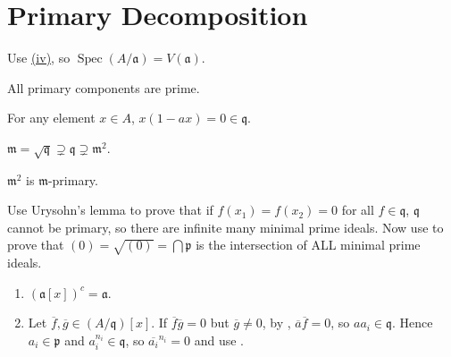 \section{Primary Decomposition}

\begin{exercise}\label{ex4.1}
	Use \hyperref[ex1.21]{(iv)}, so $\operatorname{Spec}(A/\mathfrak{a})=V(\mathfrak{a})$.
\end{exercise}

\begin{exercise}\label{ex4.2}
	All primary components are prime.
\end{exercise}

\begin{exercise}\label{ex4.3}
	For any element $x\in A$, $x(1-ax)=0\in\mathfrak{q}$.
\end{exercise}

\begin{exercise}\label{ex4.4}
	$\mathfrak{m}=\sqrt{\mathfrak{q}}\supsetneq\mathfrak{q}\supsetneq\mathfrak{m}^2$.
\end{exercise}

\begin{exercise}\label{ex4.5}
	$\mathfrak{m}^2$ is $\mathfrak{m}$-primary.
\end{exercise}

\begin{exercise}\label{ex4.6}
	Use Urysohn's lemma to prove that if $f\left(x_1\right)=f\left(x_2\right)=0$ for all $f\in\mathfrak{q}$, $\mathfrak{q}$ cannot be primary, so there are infinite many minimal prime ideals. Now use  to prove that $(0)=\sqrt{(0)}=\bigcap\mathfrak{p}$ is the intersection of ALL minimal prime ideals.
\end{exercise}

\begin{exercise}\label{ex4.7}
	\begin{enumerate}
		\item[(ii),(iv),(v)] $(\mathfrak{a}[x])^c=\mathfrak{a}$.
		\item[(iii)] Let $\overline{f},\overline{g}\in\left(A/\mathfrak{q}\right)[x]$. If $\overline{f}\overline{g}=0$ but $\overline{g}\neq0$, by , $\overline{a}\overline{f}=0$, so $aa_i\in\mathfrak{q}$. Hence $a_i\in\mathfrak{p}$ and $a_i^{n_i}\in\mathfrak{q}$, so $\overline{a_i}^{n_i}=0$ and use .
	\end{enumerate}
\end{exercise}


